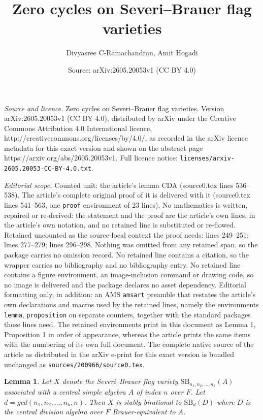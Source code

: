 \documentclass[10pt,a4paper]{amsart}
\title{Zero cycles on Severi--Brauer flag varieties}
\author{Divyasree C-Ramachandran, Amit Hogadi}
\date{Source: arXiv:2605.20053v1 (CC BY 4.0)}
\newtheorem{lemma}{Lemma}
\begin{document}
\maketitle

\noindent\emph{Source and licence.} Zero cycles on Severi--Brauer flag varieties. Version arXiv:2605.20053v1 (CC BY 4.0), distributed by arXiv under the Creative Commons Attribution 4.0 International licence, http://creativecommons.org/licenses/by/4.0/, as recorded in the arXiv licence metadata for this exact version and shown on the abstract page https://arxiv.org/abs/2605.20053v1. Full licence notice: \texttt{licenses/arxiv-2605.20053-CC-BY-4.0.txt}.\par\smallskip

\noindent\textit{Editorial scope.} Counted unit: the article's lemma CDA (source0.tex lines 536--538). The article's complete original proof of it is delivered with it (source0.tex lines 541--563, one \texttt{proof} environment of 23 lines). No mathematics is written, repaired or re-derived: the statement and the proof are the article's own lines, in the article's own notation, and no retained line is substituted or re-flowed.  Retained uncounted as the source-local context the proof needs: lines 249--251; lines 277--279; lines 296--298.  Nothing was omitted from any retained span, so the package carries no omission record.  No retained line contains a citation, so the wrapper carries no bibliography and no bibliography entry.  No retained line contains a figure environment, an image-inclusion command or drawing code, so no image is delivered and the package declares no asset dependency.  Editorial formatting only, in addition: an AMS \texttt{amsart} preamble that restates the article's own declarations and macros used by the retained lines, namely the environments \texttt{lemma}, \texttt{proposition} on separate counters, together with the standard packages those lines need.  The retained environments print in this document as Lemma 1, Proposition 1 in order of appearance, whereas the article prints the same items with the numbering of its own full document.  The complete native source of the article as distributed in the arXiv e-print for this exact version is bundled unchanged as \texttt{sources/200966/source0.tex}.
\begin{lemma}\label{Severi--Brauer flag to generalized Severi--Brauer}
     Let \(X\) denote the Severi--Brauer flag variety \(\mathrm{SB}_{n_1,n_2,\dots,n_k}(A)\) associated with a central simple algebra \(A\) of index \(n\) over \(F\). Let \( d=gcd(n_1,n_2,\dots,n_k,n)\). Then \(X\) is stably birational to \(\mathrm{SB}_d(D)\) where \(D\) is the central division algebra over \(F\) Brauer-equivalent to \(A\).
\end{lemma}
\end{document}
